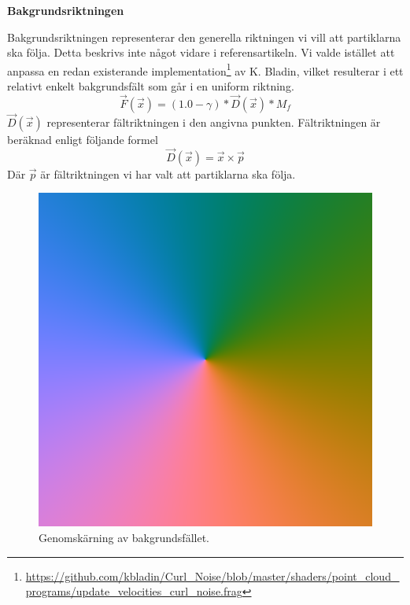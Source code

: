 \documentclass[a4paper]{article}
\begin{document}
\begin{multicols}{2}
\textbf{Bakgrundsriktningen}

Bakgrundsriktningen representerar den generella riktningen vi vill att partiklarna ska följa. Detta beskrivs inte något vidare i referensartikeln. Vi valde istället att anpassa en redan existerande implementation\footnote{\url{https://github.com/kbladin/Curl_Noise/blob/master/shaders/point_cloud_programs/update_velocities_curl_noise.frag}} av K. Bladin, vilket resulterar i ett relativt enkelt bakgrundsfält som går i en uniform riktning.
\begin{equation}
     \vec{F}(\vec{x}) = (1.0-\gamma) *  \vec{D}(\vec{x}) * M_f
\end{equation}
$ \vec{D}(\vec{x})$ representerar fältriktningen i den angivna punkten. Fältriktningen är beräknad enligt följande formel
\begin{equation}
    \vec{D}(\vec{x}) = \vec{x} \times \vec{p}
\end{equation}
Där $\vec{p}$ är fältriktningen vi har valt att partiklarna ska följa.

\begin{figure}[H]
\center
\begin{minipage}[]{0.3\textwidth}
\includegraphics[width=\textwidth]{share/Background_downscale.png}
\caption{Genomskärning av bakgrundsfället.}
\end{minipage}
\end{figure}


\end{multicols}
\end{document}
